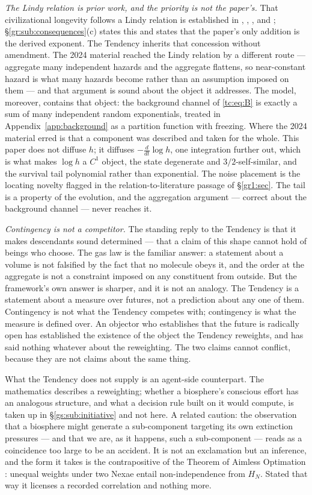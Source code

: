 \documentclass[11pt]{article}
\numberwithin{equation}{section}
\theoremstyle{plain}
\theoremstyle{definition}
\theoremstyle{remark}
\begin{document}
\emph{The Lindy relation is prior work, and the priority is not the paper's.} That civilizational longevity follows a Lindy relation is established in \cite{BC21}, \cite{BG24}, \cite{Kip20}, and \cite{Ord23}; \S\ref{gr:sub:consequences}(c) states this and states that the paper's only addition is the derived exponent. The Tendency inherits that concession without amendment. The 2024 material reached the Lindy relation by a different route --- aggregate many independent hazards and the aggregate flattens, so near-constant hazard is what many hazards become rather than an assumption imposed on them --- and that argument is sound about the object it addresses. The model, moreover, contains that object: the background channel of \eqref{tc:eq:B} is exactly a sum of many independent random exponentials, treated in Appendix~\ref{app:background} as a partition function with freezing. Where the 2024 material erred is that a component was described and taken for the whole. This paper does not diffuse $h$; it diffuses $-\tfrac{d}{dt}\log h$, one integration further out, which is what makes $\log h$ a $C^1$ object, the state degenerate and $3/2$-self-similar, and the survival tail polynomial rather than exponential. The noise placement is the locating novelty flagged in the relation-to-literature passage of \S\ref{gr1:sec}. The tail is a property of the evolution, and the aggregation argument --- correct about the background channel --- never reaches it.

\emph{Contingency is not a competitor.} The standing reply to the Tendency is that it makes descendants sound determined --- that a claim of this shape cannot hold of beings who choose. The gas law is the familiar answer: a statement about a volume is not falsified by the fact that no molecule obeys it, and the order at the aggregate is not a constraint imposed on any constituent from outside. But the framework's own answer is sharper, and it is not an analogy. The Tendency is a statement about a measure over futures, not a prediction about any one of them. Contingency is not what the Tendency competes with; contingency is what the measure is defined over. An objector who establishes that the future is radically open has established the existence of the object the Tendency reweights, and has said nothing whatever about the reweighting. The two claims cannot conflict, because they are not claims about the same thing.

What the Tendency does not supply is an agent-side counterpart. The mathematics describes a reweighting; whether a biosphere's conscious effort has an analogous structure, and what a decision rule built on it would compute, is taken up in \S\ref{gs:sub:initiative} and not here. A related caution: the observation that a biosphere might generate a sub-component targeting its own extinction pressures --- and that we are, as it happens, such a sub-component --- reads as a coincidence too large to be an accident. It is not an exclamation but an inference, and the form it takes is the contrapositive of the Theorem of Aimless Optimation \cite{Nexus}: unequal weights under two Nexae entail non-independence from $H_N$. Stated that way it licenses a recorded correlation and nothing more.
\end{document}
